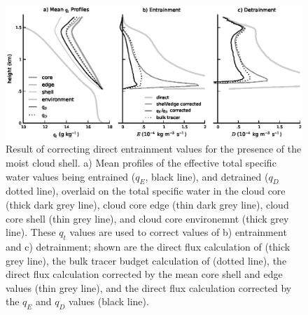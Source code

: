 \documentclass[draft,grl]{agutex}
\begin{document}
\begin{article}







%
%

\end{article}




\begin{figure}
  \noindent\includegraphics[width=39pc]{./figures/reynolds_correction}
  \caption{Result of correcting direct entrainment values for the presence of 
  the moist cloud shell.  a) Mean profiles of the effective total specific 
  water values being entrained ($q_E$, black line), and detrained ($q_D$ dotted 
  line), overlaid on the total specific water in the cloud core (thick dark 
  grey line), cloud core edge (thin dark grey line), cloud core shell (thin 
  grey line), and cloud core environemnt (thick grey line).  These $q_t$ values 
  are used to correct values of b) entrainment and c) detrainment; shown are the 
  direct flux calculation of \cite{Romps2010} (thick grey line), the bulk 
  tracer budget calculation of \cite{Siebesma1995} (dotted line), the direct 
  flux calculation corrected by the mean core shell and edge values (thin grey 
  line), and the direct flux calculation corrected by the $q_E$ and $q_D$ 
  values (black line).}
  \label{fig:Reynolds_correction}
\end{figure}
\end{document}
